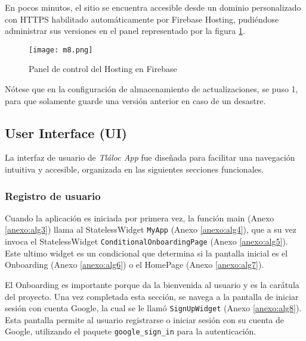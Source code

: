 En pocos minutos, el sitio se encuentra accesible desde un dominio personalizado con HTTPS habilitado automáticamente por Firebase Hosting, pudiéndose administrar sus versiones en el panel representado por la figura \ref{m8}.

\begin{figure}[ht]
\centering
  \texttt{[image: m8.png]}
  \caption{Panel de control del Hosting en Firebase}
  \label{m8}
\end{figure}

Nótese que en la configuración de almacenamiento de actualizaciones, se puso 1, para que solamente guarde una versión anterior en caso de un desastre.

















\newpage
\subsection{User Interface (UI)}



La interfaz de usuario de \textit{Tláloc App} fue diseñada para facilitar una navegación intuitiva y accesible, organizada en las siguientes secciones funcionales.








\subsubsection{Registro de usuario}

Cuando la aplicación es iniciada por primera vez, la función main (Anexo \ref{anexo:alg3}) llama al StatelessWidget \texttt{MyApp} (Anexo \ref{anexo:alg4}), que a su vez invoca el StatelessWidget \texttt{ConditionalOnboardingPage} (Anexo \ref{anexo:alg5}). Este ultimo widget es un condicional que determina si la pantalla inicial es el Onboarding (Anexo \ref{anexo:alg6}) o el HomePage (Anexo \ref{anexo:alg7}).

El Onboarding es importante porque da la bienvenida al usuario y es la carátula del proyecto. Una vez completada esta sección, se navega a la pantalla de iniciar sesión con cuenta Google, la cual se le llamó \texttt{SignUpWidget} (Anexo \ref{anexo:alg8}). Esta pantalla permite al usuario registrarse o iniciar sesión con su cuenta de Google, utilizando el paquete \texttt{google\_sign\_in} para la autenticación.

